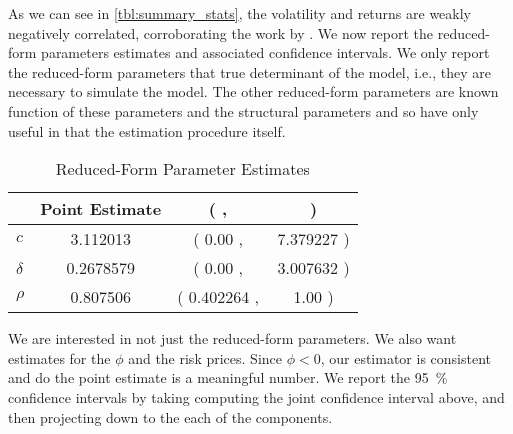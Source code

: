 \documentclass[11pt, letterpaper, twoside, final]{article}
\begin{document}
As we can see in  \cref{tbl:summary_stats}, the volatility and returns are weakly negatively correlated, corroborating the work by \textcites{bandi2012timevarying, aitsahalia2013leverage}.  We now report the reduced-form parameters  estimates and associated confidence intervals.  We only report the reduced-form parameters that true determinant of the model, i.e., they are necessary to simulate the model. The other reduced-form parameters are known function of these parameters and the structural parameters and so have only useful in that the estimation procedure itself.


\begin{table}[htb]
    \caption{Reduced-Form Parameter Estimates} 
    \label{tbl:reduced_form_parameters}

    \centering

    \begin{tabularx}{.5\textwidth}{X | S >{{(}} S[table-space-text-pre={(}] <{{,\,}}
        S[table-space-text-pre={\hspace{-1cm}}] <{{)}}}
%
        \toprule
        & {Point Estimate}  &  \\
        \midrule
        $c$         & 3.112013  & 0.00 & 7.379227 \\
        $\delta$    & 0.2678579 & 0.00 & 3.007632 \\
        $\rho$      & 0.807506  & 0.402264  & 1.00 \\
        \bottomrule 
   \end{tabularx}
\end{table}


We are interested in not just the reduced-form parameters.  We also want estimates for the $\phi$ and the risk prices.  Since $\phi < 0$, our estimator is consistent and do the point estimate is a meaningful number.  We report the \SI{95}{\percent} confidence intervals by taking computing the joint confidence interval above, and then projecting down to the each of the components.
\end{document}
